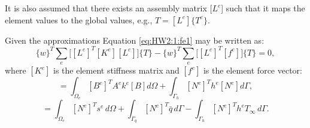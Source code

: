It is also assumed that there exists an assembly matrix $[L^e$] such that it maps the element values to the global values, e.g., $T = [L^e]\{T^e\}$. 

Given the approximations Equation \eqref{eq:HW2:1:fe1} may be written as:
\begin{equation}
 \{w\}^T \sum_e\bigg[ [L^e]^T [K^e] [L^e] \bigg] \{T\} -  \{w\}^T \sum_e\bigg[ [L^e]^T [f^e] \bigg] \{T\} = 0,
\end{equation}
where $[K^e]$ is the element stiffness matrix and $[f^e]$ is the element force vector:
\begin{equation}
[K^e] = \int_{\Omega_e} [B^e]^T A^e k^e [B] d\Omega + \int_{\Gamma_h} [N^e]^T h^e [N^e] d\Gamma,
\end{equation}
\begin{equation}
[f^e] = \int_{\Omega_e} [N^e]^T s^e \, d\Omega + \int_{\Gamma_q} [N^e]^T \bar{q} \, d\Gamma - \int_{\Gamma_h} [N^e]^T h^e T_{\infty} \, d\Gamma.
\end{equation}




